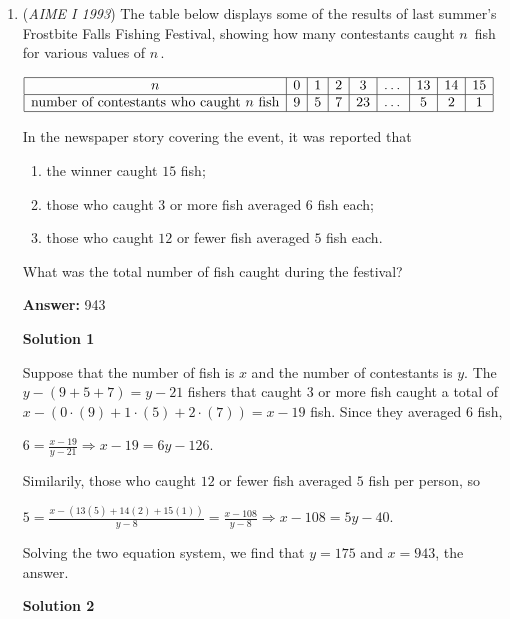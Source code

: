 \begin{enumerate}
 


	\item (\textit{AIME I 1993}) The table below displays some of the results of last summer's Frostbite Falls Fishing Festival, showing how many contestants caught $n\,$ fish for various values of $n\,$. 


 $\begin{array}{|c|c|c|c|c|c|c|c|c|} \hline n & 0 & 1 & 2 & 3 & \dots & 13 & 14 & 15 \\ \hline \text{number of contestants who caught} \ n \ \text{fish} & 9 & 5 & 7 & 23 & \dots & 5 & 2 & 1 \\ \hline \end{array}$

 In the newspaper story covering the event, it was reported that 


 
            \begin{enumerate}[label=(\roman*)]
                \item  the winner caught $15$ fish;
\item  those who caught $3$ or more fish averaged $6$ fish each;
\item  those who caught $12$ or fewer fish averaged $5$ fish each.
            \end{enumerate}
            What was the total number of fish caught during the festival?


 
 \textbf{Answer: }943



\textbf{Solution 1}

Suppose that the number of fish is $x$ and the number of contestants is $y$. The $y-(9+5+7)=y-21$ fishers that caught $3$ or more fish caught a total of $x - \left(0\cdot(9) + 1\cdot(5) + 2\cdot(7)\right) = x - 19$ fish. Since they averaged $6$ fish, 

 $6 = \frac{x - 19}{y - 21} \Longrightarrow x - 19 = 6y - 126.$

  Similarily, those who caught $12$ or fewer fish averaged $5$ fish per person, so 

 $5 = \frac{x - (13(5) + 14(2) + 15(1))}{y - 8} = \frac{x - 108}{y - 8} \Longrightarrow x - 108 = 5y - 40.$

  Solving the two equation system, we find that $y = 175$ and $x = \boxed{943}$, the answer.

 



\textbf{Solution 2}


\end{enumerate}

